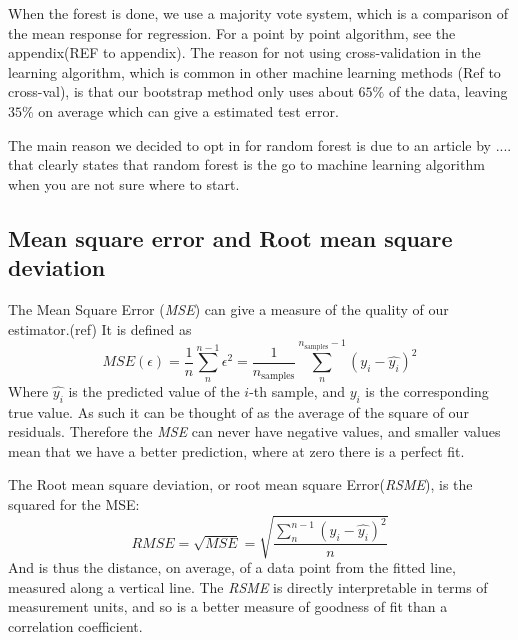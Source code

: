 When the forest is done, we use a majority vote system, which is a comparison of the mean response for regression. For a point by point algorithm, see the appendix(REF to appendix). 
The reason for not using cross-validation in the learning algorithm, which is common in other machine learning methods (Ref to cross-val), is that our bootstrap method only uses about $65\%$ of the data, leaving $35\%$ on average which can give a estimated test error. 

The main reason we decided to opt in for random forest is due to an article by .... that clearly states that random forest is the go to machine learning algorithm when you are not sure where to start. 


	
	

\subsection{Mean square error and Root mean square deviation}
The Mean Square Error (\textit{MSE}) can give a measure of the quality of our estimator.(ref) It is defined as
\begin{equation}\label{eq: mse}
	\textit{MSE}(\epsilon) = \frac{1}{n}\sum_n^{n-1}\epsilon^2 = \frac{1}{n_\text{samples}} \sum_n^{n_{\text{samples}}-1}(y_i - \hat{y_i})^2
	\end{equation}
	Where $\hat{y_i}$ is the predicted value of the $i$-th sample, and $y_i$ is the corresponding true value.
As such it can be thought of  as the average of the square of our residuals. Therefore the \textit{MSE} can never have negative values, and smaller values mean that we have a better prediction, where at zero there is a perfect fit.

The Root mean square deviation, or root mean square Error(\textit{RSME}), is the squared for the MSE:
$$RMSE = \sqrt{MSE} =  \sqrt{\frac{\sum^{n-1}_{n}(y_{i}-\hat{y_{i}})^2 }{n}} $$
And is thus the distance, on average, of a data point from the fitted line, measured along a vertical line. The \textit{RSME} is directly interpretable in terms of measurement units, and so is a better measure of goodness of fit than a correlation coefficient. 

